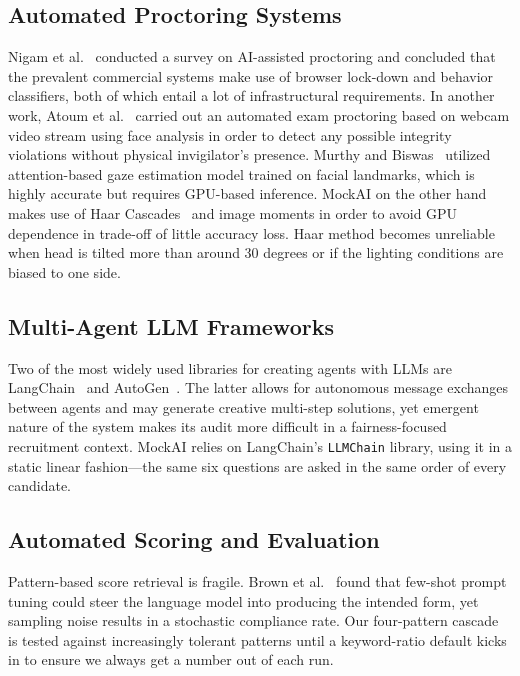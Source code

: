 \documentclass[conference]{IEEEtran}
\begin{document}
\subsection{Automated Proctoring Systems}

Nigam et al.~\cite{nigam2021proctoring} conducted a survey on
AI-assisted proctoring and concluded that the prevalent commercial
systems make use of browser lock-down and behavior classifiers, both
of which entail a lot of infrastructural requirements. In another work,
Atoum et al.~\cite{atoum2017proctoring} carried out an automated exam
proctoring based on webcam video stream using face analysis in order to
detect any possible integrity violations without physical invigilator's
presence. Murthy and Biswas~\cite{murthy2021gaze} utilized
attention-based gaze estimation model trained on facial landmarks,
which is highly accurate but requires GPU-based inference. MockAI on
the other hand makes use of Haar Cascades~\cite{viola2004haar} and
image moments in order to avoid GPU dependence in trade-off of little
accuracy loss. Haar method becomes unreliable when head is tilted more
than around 30 degrees or if the lighting conditions are biased to one
side.

\subsection{Multi-Agent LLM Frameworks}

Two of the most widely used libraries for creating agents with LLMs
are LangChain~\cite{topsakal2023langchain} and
AutoGen~\cite{wu2024autogen}. The latter allows for autonomous message
exchanges between agents and may generate creative multi-step
solutions, yet emergent nature of the system makes its audit more
difficult in a fairness-focused recruitment context. MockAI relies on
LangChain's \texttt{LLMChain} library, using it in a static linear
fashion---the same six questions are asked in the same order of every
candidate.

\subsection{Automated Scoring and Evaluation}

Pattern-based score retrieval is fragile. Brown et al.~\cite{brown2020gpt3}
found that few-shot prompt tuning could steer the language model into
producing the intended form, yet sampling noise results in a stochastic
compliance rate. Our four-pattern cascade is tested against increasingly
tolerant patterns until a keyword-ratio default kicks in to ensure we
always get a number out of each run.
\end{document}
